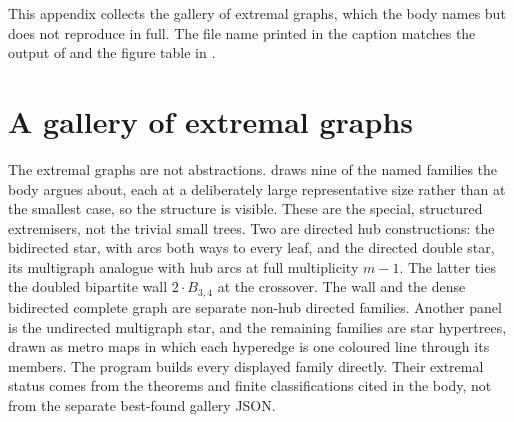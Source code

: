 This appendix collects the gallery of extremal graphs, which the body names but does not reproduce in full. The file name printed in the caption matches the output of  and the figure table in .

\section{A gallery of extremal graphs}\label{app:gallery-extremal}

The extremal graphs are not abstractions.  draws nine of the named families the body argues about, each at a deliberately large representative size rather than at the smallest case, so the structure is visible. These are the special, structured extremisers, not the trivial small trees. Two are directed hub constructions: the bidirected star, with arcs both ways to every leaf, and the directed double star, its multigraph analogue with hub arcs at full multiplicity $m-1$. The latter ties the doubled bipartite wall $2\cdot B_{3,4}$ at the crossover. The wall and the dense bidirected complete graph are separate non-hub directed families. Another panel is the undirected multigraph star, and the remaining families are star hypertrees, drawn as metro maps in which each hyperedge is one coloured line through its members. The program builds every displayed family directly. Their extremal status comes from the theorems and finite classifications cited in the body, not from the separate best-found gallery JSON.

